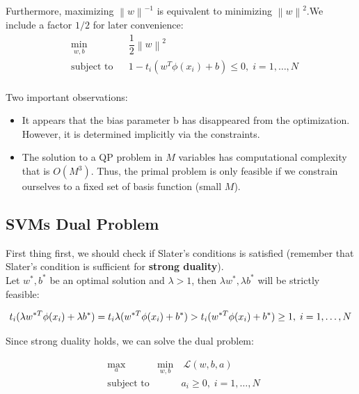 \documentclass[twoside]{article}
\newcommand{\norm}[1]{\left\lVert #1 \right\rVert}
\begin{document}
Furthermore, maximizing ${\norm{w}^{-1}}$ is equivalent to minimizing $ \norm{w}^2$.We include a factor $1/2$ for later convenience:
\begin{equation*}
\begin{aligned}
& \underset{w,b}{\text{min}}
& & \dfrac{1}{2} \norm{w}^2\\
& \text{subject to}
& & 1 - t_{i} (w^T \phi(x_{i}) +b)  \leq 0, \; i = 1, \ldots, N \\
\end{aligned}
\end{equation*}

Two important observations:
\begin{itemize}
    \item It appears that the bias parameter b has disappeared from the optimization. However, it is determined implicitly via the constraints.
    \item The solution to a QP problem in $M$ variables has computational complexity that is $O(M^3)$. Thus, the primal problem is only feasible if we constrain ourselves to a fixed set of basis function (small $M$).  
\end{itemize}

\newpage

\subsection{SVMs Dual Problem}

First thing first, we should check if Slater's conditions is satisfied (remember that Slater's condition is sufficient for \textbf{strong duality}).\\
Let $w^*,b^*$ be an optimal solution and $\lambda > 1$, then $\lambda w^*, \lambda b^*$ will be strictly feasible:

\begin{equation*}
    t_{i}(\lambda w^{*T} \phi(x_{i}) + \lambda b^*) =  t_{i} \lambda ( w^{*T} \phi(x_{i}) +  b^*) > t_{i}  ( w^{*T} \phi(x_{i}) +  b^*) \geq 1, \; i = 1, \ldots, N \\
\end{equation*}

Since strong duality holds, we can solve the dual problem:

\begin{equation*}
\begin{aligned}
& \underset{a}{\text{max}}
&  \underset{w,b}{\text{min}}
& \ \mathcal{L}(w,b,a) \\
& \text{subject to}
& & a_{i} \geq 0, \; i = 1, \ldots, N \
\end{aligned}
\end{equation*}
\end{document}
